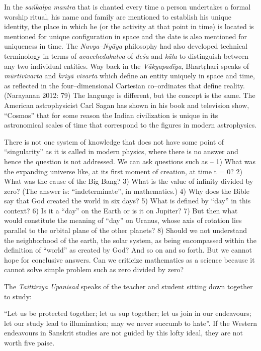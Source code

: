 In the \textit{sańkalpa mantra} that is chanted every time a person undertakes a formal worship ritual, his name and family are mentioned to establish his unique identity, the place in which he (or the activity at that point in time) is located is mentioned for unique configuration in space and the date is also mentioned for uniqueness in time. The \textit{Navya–Nyāya} philosophy had also developed technical terminology in terms of \textit{avacchedakatva} of \textit{deśa} and \textit{kāla} to distinguish between any two individual entities. Way back in the \textit{Vākyapadīya}, Bhartṛhari speaks of \textit{mūrtivivarta} and \textit{kriyā vivarta} which define an entity uniquely in space and time, as reflected in the four–dimensional Cartesian co–ordinates that define reality. (Narayanan 2012: 79) The language is different, but the concept is the same. The American astrophysicist Carl Sagan has shown in his book and television show, “Cosmos” that for some reason the Indian civilization is unique in its astronomical scales of time that correspond to the figures in modern astrophysics.

There is not one system of knowledge that does not have some point of “singularity” as it is called in modern physics, where there is no answer and hence the question is not addressed. We can ask questions such as – 1) What was the expanding universe like, at its first moment of creation, at time t = 0? 2) What was the cause of the Big Bang? 3) What is the value of infinity divided by zero? (The answer is: “indeterminate”, in mathematics.) 4) Why does the Bible say that God created the world in six days? 5) What is defined by “day” in this context? 6) Is it a “day” on the Earth or is it on Jupiter? 7) But then what would constitute the meaning of “day” on Uranus, whose axis of rotation lies parallel to the orbital plane of the other planets? 8) Should we not understand the neighborhood of the earth, the solar system, as being encompassed within the definition of “world” as created by God? And so on and so forth. But we cannot hope for conclusive answers. Can we criticize mathematics as a science because it cannot solve simple problem such as zero divided by zero?

The \textit{Taittirīya Upanisad} speaks of the teacher and student sitting down together to study: 

“Let us be protected together; let us sup together; let us join in our endeavours; let our study lead to illumination; may we never succumb to hate”. If the Western endeavours in Sanskrit studies are not guided by this lofty ideal, they are not worth five paise.


